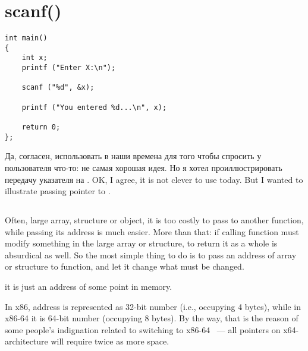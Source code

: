 ﻿\section{scanf()}
\label{label_scanf}


\begin{lstlisting}
int main() 
{
	int x;
	printf ("Enter X:\n");

	scanf ("%d", &x);

	printf ("You entered %d...\n", x);

	return 0;
};
\end{lstlisting}

\IFRU
{Да, согласен, использовать \scanf в наши времена для того чтобы спросить у пользователя что-то: 
не самая хорошая идея.
Но я хотел проиллюстрировать передачу указателя на \Tint.}
{OK, I agree, it is not clever to use \scanf today. But I wanted to illustrate passing pointer to \Tint.}

\subsection{}
\index{\CLanguageElements!\Pointers}

{Often, large array, structure or object, it is too costly to pass to another function, 
while passing its address is much easier.}
{More than that: if calling function must modify something in the large array or structure,
to return it as a whole is absurdical as well.}
{So the most simple thing to do is to pass an address of array or structure to function,
and let it change what must be changed.}

 \CCpp {}
{it is just an address of some point in memory.}

{In x86, address is represented as 32-bit number (i.e., occupying 4 bytes), while in x86-64 it is 64-bit number
(occupying 8 bytes).}
{By the way, that is the reason of some people's indignation related to switching to x86-64 ~--- all pointers
on x64-architecture will require twice as more space.}

